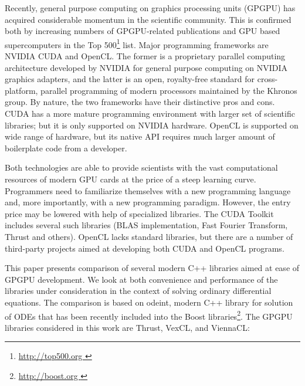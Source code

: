 \documentclass[1p]{elsarticle}
\begin{document}
Recently, general purpose computing on graphics processing units (GPGPU) has
acquired considerable momentum in the scientific community. This is confirmed
both by increasing numbers of GPGPU-related publications and GPU based
supercomputers in the Top 500\footnote{ \href{ http://top500.org }{
http://top500.org }} list. Major programming frameworks are NVIDIA CUDA and
OpenCL.  The former is a proprietary parallel computing architecture developed
by NVIDIA for general purpose computing on NVIDIA graphics adapters, and the
latter is an open, royalty-free standard for cross-platform, parallel
programming of modern processors maintained by the Khronos group. By nature,
the two frameworks have their distinctive pros and cons. CUDA has a more mature
programming environment with larger set of scientific libraries; but it is only
supported on NVIDIA hardware. OpenCL is supported on wide range of hardware,
but its native API requires much larger amount of boilerplate code from a
developer.

Both technologies are able to provide scientists with the vast computational
resources of modern GPU cards at the price of a steep learning curve.
Programmers need to familiarize
themselves with a new programming language and, more importantly, with a
new programming paradigm. However, the entry price may be lowered with help of
specialized libraries. The CUDA Toolkit includes several such libraries (BLAS
implementation, Fast Fourier Transform, Thrust and others). OpenCL lacks
standard libraries, but there are a number of third-party projects aimed at
developing both CUDA and OpenCL programs.

This paper presents comparison of several modern C++ libraries aimed
at ease of GPGPU development. We look at both convenience and
performance of the libraries under consideration in the context of
solving ordinary differential equations.  The comparison is based on
odeint, modern C++ library for solution of ODEs that has been recently
included into the Boost libraries\footnote{ \href{ http://boost.org }
  { http://boost.org } }.  The GPGPU libraries considered in this work
are Thrust, VexCL, and ViennaCL:


\end{document}
